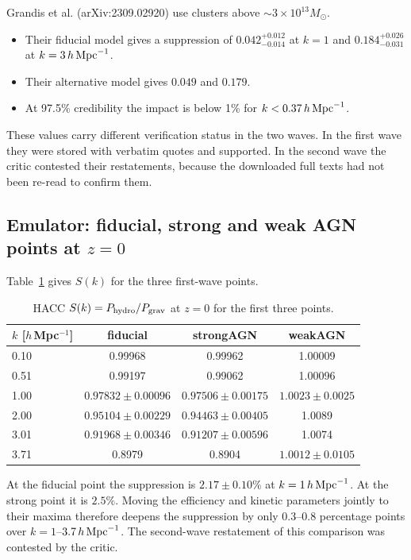 \documentclass[11pt,a4paper]{article}
\begin{document}
Grandis et al. (arXiv:2309.02920) use clusters above $\sim3\times10^{13}M_\odot$.
\begin{itemize}
\item Their fiducial model gives a suppression of $0.042^{+0.012}_{-0.014}$ at $k=1$ and $0.184^{+0.026}_{-0.031}$ at $k=3\,h\,{\rm Mpc}^{-1}$.
\item Their alternative model gives $0.049$ and $0.179$.
\item At 97.5\% credibility the impact is below 1\% for $k<0.37\,h\,{\rm Mpc}^{-1}$.
\end{itemize}

These values carry different verification status in the two waves. In the first wave they were stored with verbatim quotes and supported. In the second wave the critic contested their restatements, because the downloaded full texts had not been re-read to confirm them.

\subsection{Emulator: fiducial, strong and weak AGN points at $z=0$}
Table~\ref{tab:three} gives $S(k)$ for the three first-wave points.

\begin{table}
\centering
\begin{tabular}{lccc}
\toprule
$k$ [$h\,$Mpc$^{-1}$] & fiducial & strongAGN & weakAGN\\
\midrule
0.10 & 0.99968 & 0.99962 & 1.00009\\
0.51 & 0.99197 & 0.99062 & 1.00096\\
1.00 & $0.97832\pm0.00096$ & $0.97506\pm0.00175$ & $1.0023\pm0.0025$\\
2.00 & $0.95104\pm0.00229$ & $0.94463\pm0.00405$ & 1.0089\\
3.01 & $0.91968\pm0.00346$ & $0.91207\pm0.00596$ & 1.0074\\
3.71 & 0.8979 & 0.8904 & $1.0012\pm0.0105$\\
\bottomrule
\end{tabular}
\caption{HACC $S(k)=P_{\rm hydro}/P_{\rm grav}$ at $z=0$ for the first three points.}
\label{tab:three}
\end{table}

At the fiducial point the suppression is $2.17\pm0.10\%$ at $k=1\,h\,{\rm Mpc}^{-1}$. At the strong point it is $2.5\%$. Moving the efficiency and kinetic parameters jointly to their maxima therefore deepens the suppression by only 0.3--0.8 percentage points over $k=1$--$3.7\,h\,{\rm Mpc}^{-1}$. The second-wave restatement of this comparison was contested by the critic.
\end{document}
